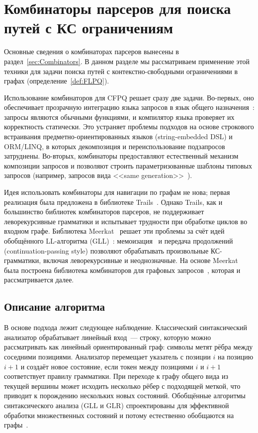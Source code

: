 \section{Комбинаторы парсеров для поиска путей с КС ограничениям}
	\label{sec:CFPQ_Combinators}

Основные сведения о комбинаторах парсеров вынесены в раздел~\ref{sec:Combinators}.
В данном разделе мы рассматриваем применение этой техники для задачи поиска путей с контекстно-свободными ограничениями в графах (определение~\ref{def:FLPQ}).

Использование комбинаторов для CFPQ решает сразу две задачи.
Во-первых, оно обеспечивает прозрачную интеграцию языка запросов в язык общего назначения~: запросы являются обычными функциями, и компилятор языка проверяет их корректность статически.
Это устраняет проблемы подходов на основе строкового встраивания предметно-ориентированных языков (string-embedded DSL) и ORM/LINQ, в которых декомпозиция и переиспользование подзапросов затруднены.
Во-вторых, комбинаторы предоставляют естественный механизм композиции запросов и позволяют строить параметризованные шаблоны типовых запросов (например, запросов вида <<same generation>>~).

Идея использовать комбинаторы для навигации по графам не нова; первая реализация была предложена в библиотеке Trails~.
Однако Trails, как и большинство библиотек комбинаторов парсеров, не поддерживает леворекурсивные грамматики и испытывает трудности при обработке циклов во входном графе.
Библиотека Meerkat~ решает эти проблемы за счёт идей обобщённого LL-алгоритма (GLL)~: мемоизация~ и передача продолжений (continuation-passing style) позволяют обрабатывать произвольные КС-грамматики, включая леворекурсивные и неоднозначные.
На основе Meerkat была построена библиотека комбинаторов для графовых запросов~, которая и рассматривается далее.

\subsection{Описание алгоритма}
\label{subsec:CFPQ_Combinators_description}

В основе подхода лежит следующее наблюдение.
Классический синтаксический анализатор обрабатывает линейный вход~--- строку, которую можно рассматривать как линейный ориентированный граф: символы метят рёбра между соседними позициями.
Анализатор перемещает указатель с позиции $i$ на позицию $i+1$ и создаёт новое состояние, если токен между позициями $i$ и $i+1$ соответствует правилу грамматики.
При переходе к графу общего вида из текущей вершины может исходить несколько рёбер с подходящей меткой, что приводит к порождению нескольких новых состояний.
Обобщённые алгоритмы синтаксического анализа (GLL и GLR) спроектированы для эффективной обработки множественных состояний и потому естественно обобщаются на графы~.

